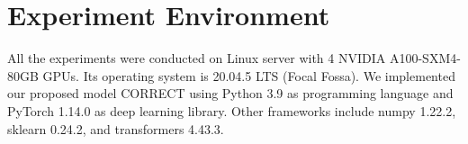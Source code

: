 \section{Experiment Environment}
\label{sec:experiment_environment}

All the experiments were conducted on Linux server with 4 NVIDIA A100-SXM4-80GB GPUs. Its operating system is 20.04.5 LTS (Focal Fossa). We implemented our proposed model CORRECT using Python 3.9 as programming language and PyTorch 1.14.0 as deep learning library. Other frameworks include numpy 1.22.2, sklearn 0.24.2, and transformers 4.43.3.